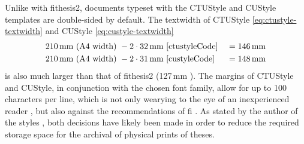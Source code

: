 \documentclass[12pt,twoside,cover,color,table]%
  {fithesis3/fithesis3/fithesis3} %
\begin{document}
  Unlike with \textsf{fithesis2}, documents typeset with the
  CTUStyle and CUStyle templates are double-sided by default. The
  \gls{textwidth} of CTUStyle \eqref{eq:ctustyle-textwidth} and
  CUStyle \eqref{eq:custyle-textwidth}\begin{align}
    \label{eq:ctustyle-textwidth} 210\text{\,mm}\text{ (A4 width) }
      &- 2\cdot32\text{\,mm} \text{ \cite[line~249]{ctustyleCode} }
      &= 146\text{\,mm} \\
    \label{eq:custyle-textwidth}  210\text{\,mm}\text{ (A4 width) }
      &- 2\cdot31\text{\,mm} \text{ \cite[line~229]{custyleCode} }
      &= 148\text{\,mm}
  \end{align} is also much larger than that of \textsf{fithesis2}
  (127\,mm \cite[lines~989, 1017, 1045]{fithesis2Code}). The
  margins of CTUStyle and CUStyle, in conjunction with the chosen
  font family, \label{overlong-lines} allow for up to 100
  characters per line, which is not only wearying to the eye of an
  inexperienced reader \cite[section~2.1.2]{eletypostyle}, but also
  against the recommendations of \gls{fi}
  \cite[section~3.2.3]{bpdpfi}. As stated by the author of the
  styles \cite[post~25]{ctustyle-forums}, both decisions have
  likely been made in order to reduce the required storage space
  for the archival of physical prints of theses.
\end{document}
